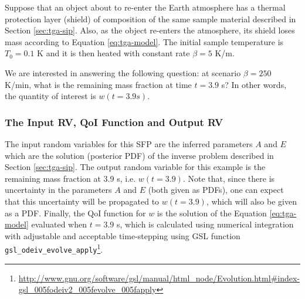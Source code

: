 Suppose that an object about to re-enter the Earth atmosphere has a thermal
protection layer (shield) of composition of the same sample material described
in Section \ref{sec:tga-sip}. Also, as the object re-enters the atmosphere, its
shield loses mass according to Equation \eqref{eq:tga-model}.  The initial
sample temperature is $T_0=0.1$ K and it is then heated with constant rate
$\beta=5$ K/m.

We are interested in answering the following question: at scenario $\beta=250$
K/min, what is the remaining mass fraction at time $t=3.9$ s? In other words,
the quantity of interest is $w(t=3.9s)$.




\subsubsection{The Input RV, QoI Function and Output RV}


The input random variables for this SFP are the inferred parameters $A$ and $E$ which are the solution (posterior PDF) of the inverse problem described in Section \ref{sec:tga-sip}. The output random variable for this example is the remaining mass fraction at 3.9 s, i.e. $w(t=3.9)$. Note that, since there is uncertainty in the parameters $A$ and $E$ (both given as PDFs), one can expect that this uncertainty will be propagated to $w(t=3.9)$, which will also be given as a PDF. Finally, the QoI function for $w$ is the solution of the Equation \eqref{eq:tga-model} evaluated when $t=3.9$ s, which is calculated using numerical integration with adjustable and acceptable time-stepping using GSL function \verb+gsl_odeiv_evolve_apply+\footnote{\url{http://www.gnu.org/software/gsl/manual/html_node/Evolution.html\#index-gsl_005fodeiv2_005fevolve_005fapply}}.

